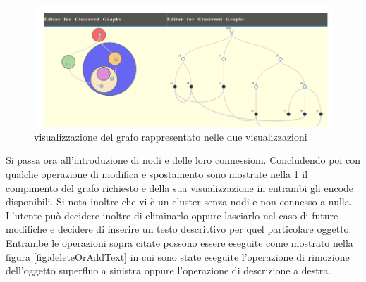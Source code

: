 \begin{figure}[!htb]
	\begin{center}
		\includegraphics[width=1 \linewidth]{figure/views}
	\end{center}
	\caption{visualizzazione del grafo rappresentato nelle due visualizzazioni \label{fig:views}}
\end{figure}
Si passa ora all'introduzione di nodi e delle loro connessioni. Concludendo poi con qualche operazione di modifica e spostamento sono mostrate nella  \figurename{\ref{fig:views}} il compimento del grafo richiesto e della sua visualizzazione in entrambi gli encode disponibili. 
Si nota inoltre che vi è un cluster senza nodi e non connesso a nulla. L'utente può decidere inoltre di eliminarlo oppure lasciarlo nel caso di future modifiche e decidere di inserire un testo descrittivo per quel particolare oggetto. Entrambe le operazioni sopra citate possono essere eseguite come mostrato nella figura \figurename{\ref{fig:deleteOrAddText}} in cui sono state eseguite l'operazione di rimozione dell'oggetto superfluo a sinistra oppure l'operazione di descrizione a destra.

